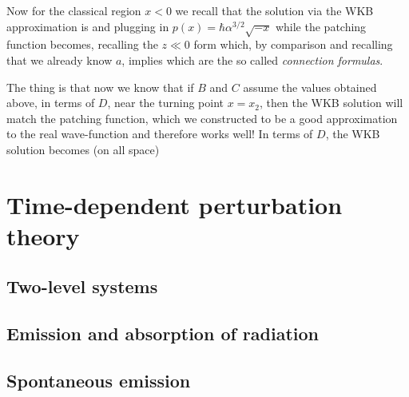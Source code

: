 \documentclass[oneside, 12pt, notitlepage]{book}
\begin{document}
Now for the classical region \(x<0\) we recall that the solution via the WKB approximation is
and plugging in \(p(x) = \hbar \alpha^{3/2}\sqrt{-x}\)
while the patching function becomes, recalling the \(z\ll 0\) form
which, by comparison and recalling that we already know \(a\), implies
which are the so called \emph{connection formulas}.\par

The thing is that now we know that if \(B\) and \(C\) assume the values obtained above, in terms of \(D\), near the turning point \(x = x_2\), then the WKB solution will match the patching function, which we constructed to be a good approximation to the real wave-function and therefore works well! In terms of \(D\), the WKB solution becomes (on all space)

\chapter{Time-dependent perturbation theory}

\section{Two-level systems}

\section{Emission and absorption of radiation}

\section{Spontaneous emission}
\end{document}
